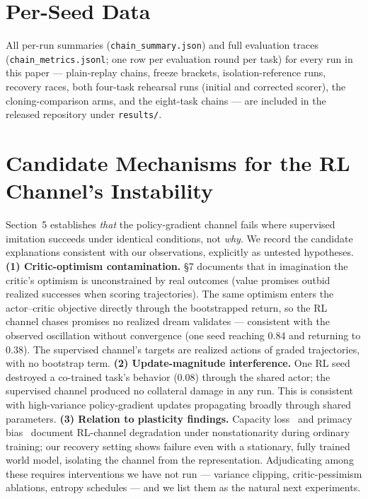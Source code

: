 \documentclass[10pt]{article}
\begin{document}
\section{Per-Seed Data}
\label{app:seeds}

All per-run summaries (\texttt{chain\_summary.json}) and full evaluation traces
(\texttt{chain\_metrics.jsonl}; one row per evaluation round per task) for every run in this
paper --- plain-replay chains, freeze brackets, isolation-reference runs, recovery races,
both four-task rehearsal runs (initial and corrected scorer), the cloning-comparison arms,
and the eight-task chains --- are included in the released repository under
\texttt{results/}.

\section{Candidate Mechanisms for the RL Channel's Instability}
\label{app:mech}

Section~5 establishes \emph{that} the policy-gradient channel fails where supervised
imitation succeeds under identical conditions, not \emph{why}. We record the candidate
explanations consistent with our observations, explicitly as untested hypotheses.
\textbf{(1) Critic-optimism contamination.} \S7 documents that in imagination the critic's
optimism is unconstrained by real outcomes (value promises outbid realized successes when
scoring trajectories). The same optimism enters the actor--critic objective directly through
the bootstrapped return, so the RL channel chases promises no realized dream validates ---
consistent with the observed oscillation without convergence (one seed reaching 0.84 and
returning to 0.38). The supervised channel's targets are realized actions of graded
trajectories, with no bootstrap term. \textbf{(2) Update-magnitude interference.} One RL seed
destroyed a co-trained task's behavior (0.08) through the shared actor; the supervised channel
produced no collateral damage in any run. This is consistent with high-variance policy-gradient
updates propagating broadly through shared parameters. \textbf{(3) Relation to plasticity
findings.} Capacity loss~\cite{lyle2022understanding} and primacy
bias~\cite{nikishin2022primacy} document RL-channel degradation under nonstationarity during
ordinary training; our recovery setting shows failure even with a stationary, fully trained
world model, isolating the channel from the representation. Adjudicating among these requires
interventions we have not run --- variance clipping, critic-pessimism ablations, entropy
schedules --- and we list them as the natural next experiments.
\end{document}
